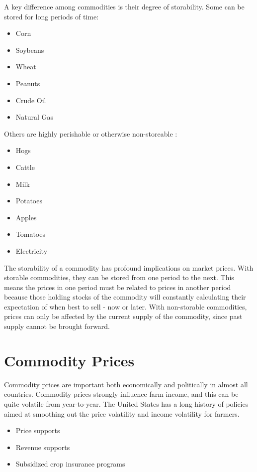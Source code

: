 \documentclass[
  letterpaper,
  DIV=11,
  numbers=noendperiod]{scrreprt}
\providecommand{\tightlist}{%
  \setlength{\itemsep}{0pt}\setlength{\parskip}{0pt}}\usepackage{longtable,booktabs,array}
\begin{document}
A key difference among commodities is their degree of storability. Some
can be stored for long periods of time:

\begin{itemize}
\tightlist
\item
  Corn
\item
  Soybeans
\item
  Wheat
\item
  Peanuts
\item
  Crude Oil
\item
  Natural Gas
\end{itemize}

Others are highly perishable or otherwise non-storeable :

\begin{itemize}
\tightlist
\item
  Hogs
\item
  Cattle
\item
  Milk
\item
  Potatoes
\item
  Apples
\item
  Tomatoes
\item
  Electricity
\end{itemize}

The storability of a commodity has profound implications on market
prices. With storable commodities, they can be stored from one period to
the next. This means the prices in one period must be related to prices
in another period because those holding stocks of the commodity will
constantly calculating their expectation of when best to sell - now or
later. With non-storable commodities, prices can only be affected by the
current supply of the commodity, since past supply cannot be brought
forward.

\hypertarget{commodity-prices}{%
\section{Commodity Prices}\label{commodity-prices}}

Commodity prices are important both economically and politically in
almost all countries. Commodity prices strongly influence farm income,
and this can be quite volatile from year-to-year. The United States has
a long history of policies aimed at smoothing out the price volatility
and income volatility for farmers.

\begin{itemize}
\tightlist
\item
  Price supports
\item
  Revenue supports
\item
  Subsidized crop insurance programs
\end{itemize}
\end{document}
